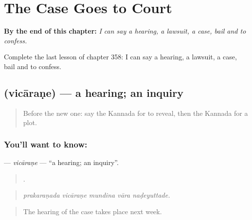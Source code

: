 
\chapter{The Case Goes to Court}
\label{ch:ka-the-case-goes-to-court}

\begin{chapteropening}
\textbf{By the end of this chapter:} \emph{I can say a hearing, a lawsuit, a case, bail and to confess.}

Complete the last lesson of chapter 358: I can say a hearing, a lawsuit, a case, bail and to confess.
\end{chapteropening}

\section[\texorpdfstring{\kn{ವಿಚಾರಣೆ} (vicāraṇe)}{ವಿಚಾರಣೆ (vicāraṇe)}]{ (vicāraṇe) — a hearing; an inquiry}

\label{lesson:KA-C358-vicarane}



\begin{quote}
Before the new one: say the Kannada for to reveal, then the Kannada for a plot.
\end{quote}

\subsection*{You'll want to know: }
\textbf{} — \emph{vicāraṇe} — \textquotedblleft{}a hearing; an inquiry\textquotedblright{}.

\begin{quote}
    .
\end{quote}

\begin{quote}
\emph{prakaraṇada vicāraṇe mundina vāra naḍeyuttade.}
\end{quote}

\begin{quote}
The hearing of the case takes place next week.
\end{quote}

